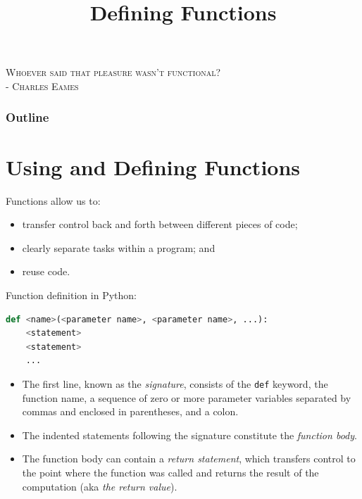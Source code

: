 \documentclass[8pt,a4paper,compress,handout]{beamer}
\title{Defining Functions}
\date{}
\begin{document}
\begin{frame}
\begin{flushright}
\tiny \textsc{Whoever said that pleasure wasn't functional? \\ - Charles Eames}
\end{flushright}
\titlepage
\end{frame}

\begin{frame}
\frametitle{Outline}
\tableofcontents
\end{frame}

\section{Using and Defining Functions}
\begin{frame}[fragile]
Functions allow us to:
\begin{itemize}
\item transfer control back and forth between different pieces of code; 
\item clearly separate tasks within a program; and
\item reuse code.
\end{itemize}

\bigskip

Function definition in Python:
\begin{lstlisting}[language=Python]
def <name>(<parameter name>, <parameter name>, ...):
    <statement>
    <statement>
    ...
\end{lstlisting}

\begin{itemize}
\item The first line, known as the \emph{signature}, consists of the \lstinline{def} keyword, the function name, a sequence of zero or more parameter variables separated by commas and enclosed in parentheses, and a colon.

\item The indented statements following the signature constitute the \emph{function body}.

\item The function body can contain a \emph{return statement}, which transfers control to the point where the function was called and returns the result of the computation (aka \emph{the return value}).
\end{itemize}
\end{frame}
\end{document}

